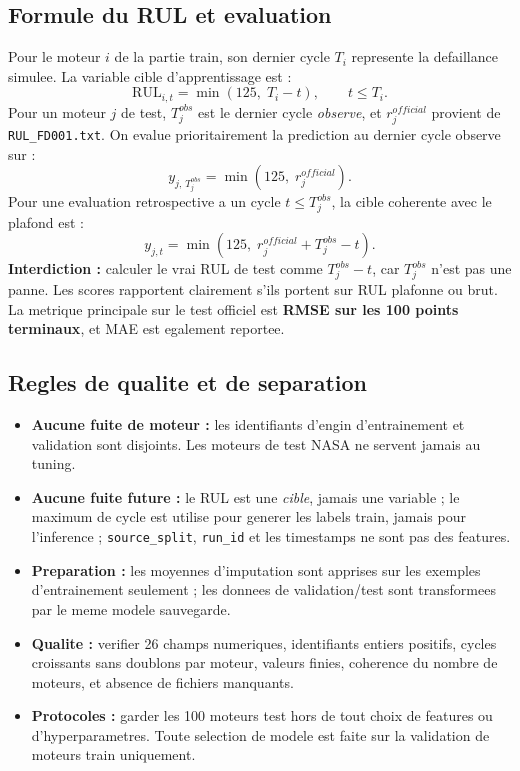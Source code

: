 \documentclass[10pt,a4paper]{article}
\newcommand{\code}[1]{{\small\ttfamily\nolinkurl{#1}}}
\begin{document}
\subsection{Formule du RUL et evaluation}
Pour le moteur \(i\) de la partie train, son dernier cycle \(T_i\) represente la defaillance simulee. La variable cible d'apprentissage est :
\[
\mathrm{RUL}_{i,t}=\min\left(125,\;T_i-t\right), \qquad t\leq T_i.
\]
Pour un moteur \(j\) de test, \(T_j^{obs}\) est le dernier cycle \emph{observe}, et \(r_j^{official}\) provient de \code{RUL_FD001.txt}. On evalue prioritairement la prediction au dernier cycle observe sur :
\[
 y_{j,\,T_j^{obs}} = \min\left(125,\;r_j^{official}\right).
\]
Pour une evaluation retrospective a un cycle \(t\leq T_j^{obs}\), la cible coherente avec le plafond est :
\[
 y_{j,t}=\min\left(125,\;r_j^{official}+T_j^{obs}-t\right).
\]
\textbf{Interdiction :} calculer le vrai RUL de test comme \(T_j^{obs}-t\), car \(T_j^{obs}\) n'est pas une panne. Les scores rapportent clairement s'ils portent sur RUL plafonne ou brut. La metrique principale sur le test officiel est \textbf{RMSE sur les 100 points terminaux}, et MAE est egalement reportee.

\subsection{Regles de qualite et de separation}
\begin{itemize}
\item \textbf{Aucune fuite de moteur :} les identifiants d'engin d'entrainement et validation sont disjoints. Les moteurs de test NASA ne servent jamais au tuning.
\item \textbf{Aucune fuite future :} le RUL est une \emph{cible}, jamais une variable ; le maximum de cycle est utilise pour generer les labels train, jamais pour l'inference ; \code{source_split}, \code{run_id} et les timestamps ne sont pas des features.
\item \textbf{Preparation :} les moyennes d'imputation sont apprises sur les exemples d'entrainement seulement ; les donnees de validation/test sont transformees par le meme modele sauvegarde.
\item \textbf{Qualite :} verifier 26 champs numeriques, identifiants entiers positifs, cycles croissants sans doublons par moteur, valeurs finies, coherence du nombre de moteurs, et absence de fichiers manquants.
\item \textbf{Protocoles :} garder les 100 moteurs test hors de tout choix de features ou d'hyperparametres. Toute selection de modele est faite sur la validation de moteurs train uniquement.
\end{itemize}
\end{document}
